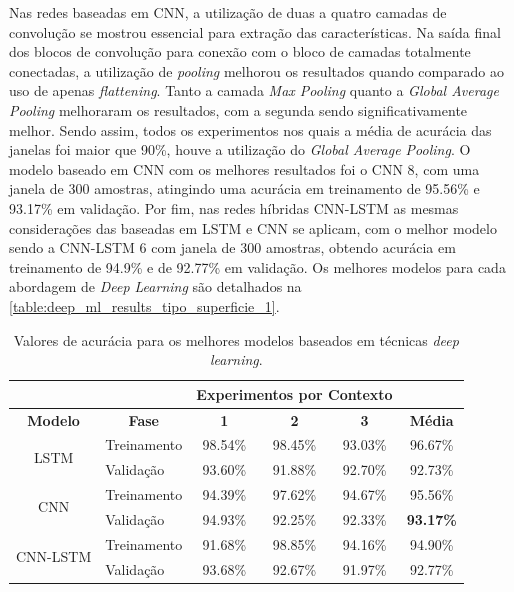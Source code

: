 Nas redes baseadas em CNN, a utilização de duas a quatro camadas de convolução se mostrou essencial para extração das características. Na saída final dos blocos de convolução para conexão com o bloco de camadas totalmente conectadas, a utilização de \textit{pooling} melhorou os resultados quando comparado ao uso de apenas \textit{flattening}. Tanto a camada \textit{Max Pooling} quanto a \textit{Global Average Pooling} melhoraram os resultados, com a segunda sendo significativamente melhor. Sendo assim, todos os experimentos nos quais a média de acurácia das janelas foi maior que 90\%, houve a utilização do \textit{Global Average Pooling}. O modelo baseado em CNN com os melhores resultados foi o CNN 8, com uma janela de 300 amostras, atingindo uma acurácia em treinamento de 95.56\% e 93.17\% em validação. Por fim, nas redes híbridas CNN-LSTM as mesmas considerações das baseadas em LSTM e CNN se aplicam, com o melhor modelo sendo a CNN-LSTM 6 com janela de 300 amostras, obtendo acurácia em treinamento de 94.9\% e de 92.77\% em validação. Os melhores modelos para cada abordagem de \textit{Deep Learning} são detalhados na \autoref{table:deep_ml_results_tipo_superficie_1}.

\begin{table}[H]
\scriptsize
\centering
\caption{Valores de acurácia para os melhores modelos baseados em técnicas \textit{deep learning}.} 
\label{table:deep_ml_results_tipo_superficie_1}
\begin{tabular}{clcccc}
\cmidrule(lr){3-5}
& & \multicolumn{3}{c}{\textbf{Experimentos por Contexto}} & \multicolumn{1}{c}{} \\ \midrule
\textbf{Modelo} & \multicolumn{1}{c}{\textbf{Fase}} & \textbf{1} & \textbf{2} & \textbf{3} & \textbf{Média} \\ \midrule
\multirow{2}{*}{LSTM} & Treinamento & 98.54\% & 98.45\% & 93.03\% & 96.67\% \\ \cmidrule(l){2-6} 
 & Validação & 93.60\% & 91.88\% & 92.70\% & 92.73\% \\ \midrule
\multirow{2}{*}{CNN} & Treinamento & 94.39\% & 97.62\% & 94.67\% & 95.56\% \\ \cmidrule(l){2-6} 
 & Validação & 94.93\% & 92.25\% & 92.33\% & \cellcolor[HTML]{34FF34}\textbf{93.17\%} \\ \midrule
\multirow{2}{*}{CNN-LSTM} & Treinamento & 91.68\% & 98.85\% & 94.16\% & 94.90\% \\ \cmidrule(l){2-6} 
 & Validação & 93.68\% & 92.67\% & 91.97\% & 92.77\% \\ \bottomrule
\end{tabular}
\end{table}

